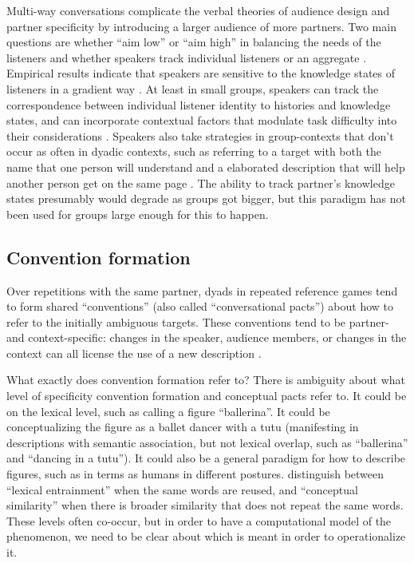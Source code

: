 \documentclass[]{article}
\begin{document}
Multi-way conversations complicate the verbal theories of audience design and partner specificity by introducing a larger audience of more partners. Two main questions are whether ``aim low'' or ``aim high'' in balancing the needs of the listeners and whether speakers track individual listeners or an aggregate \cite{yoon2014}. Empirical results indicate that speakers are sensitive to the knowledge states of listeners in a gradient way \citep{yoon2014, yoon2018, yoon2019}. At least in small groups, speakers can track the correspondence between individual listener identity to histories and knowledge states, and can incorporate contextual factors that modulate task difficulty into their considerations \citep{yoon2019a}. Speakers also take strategies in group-contexts that don't occur as often in dyadic contexts, such as referring to a target with both the name that one person will understand and a elaborated description that will help another person get on the same page \citep{yoon2018}. The ability to track partner's knowledge states presumably would degrade as groups got bigger, but this paradigm has not been used for groups large enough for this to happen. 

\subsection{Convention formation}
Over repetitions with the same partner, dyads in repeated reference games tend to form shared ``conventions'' (also called ``conversational pacts'') about how to refer to the initially ambiguous targets. These conventions tend to be partner- and context-specific: changes in the speaker, audience members, or changes in the context can all license the use of a new description \citep{metzing2003a, ibarra2016, yoon2014}.

What exactly does convention formation refer to? There is ambiguity about what level of specificity convention formation and conceptual pacts refer to. It could be on the lexical level, such as calling a figure ``ballerina''. It could be conceptualizing the figure as a ballet dancer with a tutu (manifesting in descriptions with semantic association, but not lexical overlap, such as ``ballerina'' and ``dancing in a tutu''). It could also be a general paradigm for how to describe figures, such as in terms as humans in different postures.  \citet{horton2002a} distinguish between ``lexical entrainment'' when the same words are reused, and ``conceptual similarity'' when there is broader similarity that does not repeat the same words. These levels often co-occur, but in order to have a computational model of the phenomenon, we need to be clear about which is meant in order to operationalize it.  
\end{document}
